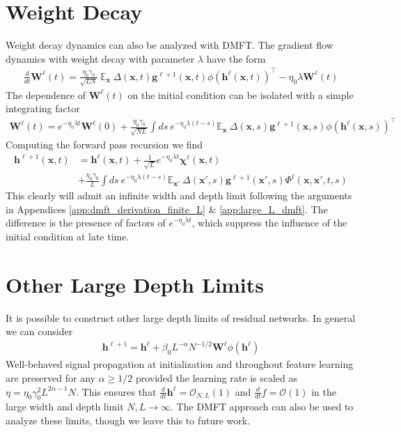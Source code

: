 \documentclass{article} %
\def\h{\bm h}
\def\x{\bm x}
\def\g{\bm g}
\def\W{\bm W}
\begin{document}
\section{Weight Decay}

Weight decay dynamics can also be analyzed with DMFT. The gradient flow dynamics with weight decay with parameter $\lambda$ have the form
\begin{align}
    \frac{d}{dt} \W^\ell(t) =  \frac{\eta_0\gamma_0}{\sqrt{L N}} \ \mathbb{E}_{\x} \  \Delta(\x,t) \g^{\ell+1}(\x,t) \phi(\h^\ell(\x,t))^\top - \eta_0 \lambda \W^{\ell}(t) 
\end{align}
The dependence of $\W^\ell(t)$ on the initial condition can be isolated with a simple integrating factor
\begin{align}
    \W^\ell(t) = e^{-\eta_0 \lambda t} \W^{\ell}(0) + \frac{\eta_0 \gamma_0 }{\sqrt{NL}}\int ds \  e^{-\eta_0\lambda (t-s)} \mathbb{E}_{\x} \  \Delta(\x,s) \g^{\ell+1}(\x,s) \phi(\h^\ell(\x,s))^\top 
\end{align}
Computing the forward pass recursion we find
\begin{align}
    \h^{\ell+1}(\x,t) &= \h^{\ell}(\x,t) + \frac{1}{\sqrt L} e^{-\eta_0 \lambda t} \bm\chi^{\ell}(\x,t) \nonumber
    \\
    &+ \frac{\eta_0 \gamma_0}{L} \int ds  \  e^{-\eta_0\lambda (t-s)} \mathbb{E}_{\x'} \  \Delta(\x',s) \g^{\ell+1}(\x',s) \Phi^\ell(\x,\x',t,s) 
\end{align}
This clearly will admit an infinite width and depth limit following the arguments in Appendices \ref{app:dmft_derivation_finite_L} \& \ref{app:large_L_dmft}. The difference is the presence of factors of $e^{-\eta_0 \lambda t}$, which suppress the influence of the initial condition at late time. 


\section{Other Large Depth Limits}

It is possible to construct other large depth limits of residual networks. In general we can consider 
\begin{align}
    \h^{\ell+1} = \h^\ell + \beta_0 L^{-\alpha} N^{-1/2}  \W^\ell \phi(\h^\ell)
\end{align}
Well-behaved signal propagation at initialization and throughout feature learning are preserved for any $\alpha \geq 1/2$ provided the learning rate is scaled as $\eta=\eta_0 \gamma_0^2 L^{2\alpha - 1} N$. This ensures that $\frac{d}{dt} \h^\ell = \mathcal{O}_{N,L}(1)$ and $\frac{d}{dt} f = \mathcal{O}(1)$ in the large width and depth limit $N,L \to \infty$. The DMFT approach can also be used to analyze these limits, though we leave this to future work. 
\end{document}
